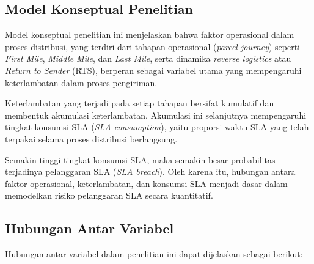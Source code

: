 \subsection{Model Konseptual Penelitian}

Model konseptual penelitian ini menjelaskan bahwa faktor operasional dalam proses distribusi, yang terdiri dari tahapan operasional (\textit{parcel journey}) seperti \textit{First Mile}, \textit{Middle Mile}, dan \textit{Last Mile}, serta dinamika \textit{reverse logistics} atau \textit{Return to Sender} (RTS), berperan sebagai variabel utama yang mempengaruhi keterlambatan dalam proses pengiriman.

Keterlambatan yang terjadi pada setiap tahapan bersifat kumulatif dan membentuk akumulasi keterlambatan. Akumulasi ini selanjutnya mempengaruhi tingkat konsumsi SLA (\textit{SLA consumption}), yaitu proporsi waktu SLA yang telah terpakai selama proses distribusi berlangsung.

Semakin tinggi tingkat konsumsi SLA, maka semakin besar probabilitas terjadinya pelanggaran SLA (\textit{SLA breach}). Oleh karena itu, hubungan antara faktor operasional, keterlambatan, dan konsumsi SLA menjadi dasar dalam memodelkan risiko pelanggaran SLA secara kuantitatif. 

\subsection{Hubungan Antar Variabel}

Hubungan antar variabel dalam penelitian ini dapat dijelaskan sebagai berikut:

